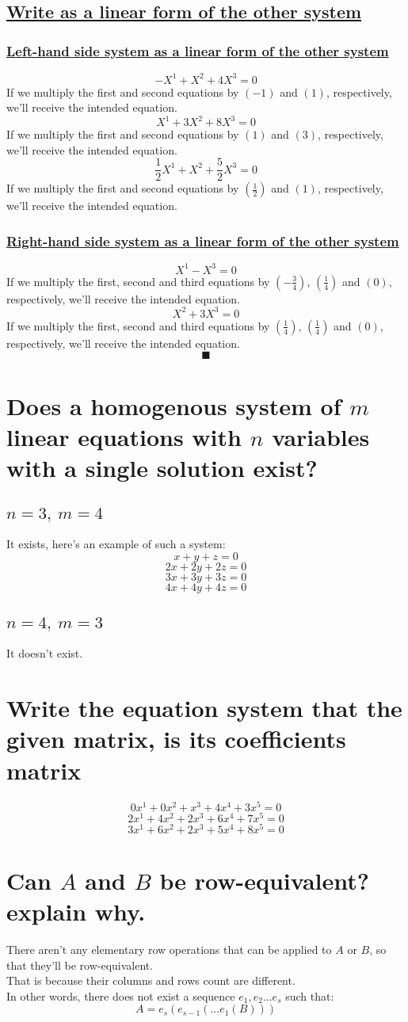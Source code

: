 \documentclass[a4paper, 12pt]{article}
\newcommand{\sub}[1]{\subsection{\underline{#1}}}
\newcommand{\subsub}[1]{\subsubsection{\underline{#1}}}
\newcommand{\?}{\stackrel{?}{=}}
\renewcommand{\qed}{$$\blacksquare$$}
\begin{document}
\sub{Write as a linear form of the other system}
\subsub{Left-hand side system as a linear form of the other system}
$$ -X^1 + X^2 + 4X^3 = 0 $$
If we multiply the first and second equations by $(-1)$ and $(1)$, respectively, we'll receive the intended equation.
$$ X^1 + 3X^2 + 8X^3 = 0 $$
If we multiply the first and second equations by $(1)$ and $(3)$, respectively, we'll receive the intended equation.
$$ \frac{1}{2}X^1 + X^2 + \frac{5}{2}X^3 = 0 $$
If we multiply the first and second equations by $(\frac{1}{2})$ and $(1)$, respectively, we'll receive the intended equation.

\subsub{Right-hand side system as a linear form of the other system}
$$ X^1 - X^3 = 0 $$
If we multiply the first, second and third equations by $(-\frac{3}{4})$, $(\frac{1}{4})$ and $(0)$, respectively, we'll receive the intended equation.
$$ X^2 + 3X^3 = 0 $$
If we multiply the first, second and third equations by $(\frac{1}{4})$, $(\frac{1}{4})$ and $(0)$, respectively, we'll receive the intended equation.
\qed\pagebreak

\setcounter{section}{12}
\section{Does a homogenous system of $m$ linear equations with $n$ variables with a single solution exist?}
\sub{$n=3,~m=4$}
It exists, here's an example of such a system:
$$ x+y+z=0 $$
$$ 2x+2y+2z=0 $$
$$ 3x+3y+3z=0 $$
$$ 4x+4y+4z=0 $$
\sub{$n=4,~m=3$}
It doesn't exist.

\setcounter{section}{15}
\section{Write the equation system that the given matrix, is its coefficients matrix}
$$ 0x^1+0x^2+x^3+4x^4+3x^5=0 $$
$$ 2x^1+4x^2+2x^3+6x^4+7x^5=0 $$
$$ 3x^1+6x^2+2x^3+5x^4+8x^5=0 $$

\setcounter{section}{17}
\section{Can $A$ and $B$ be row-equivalent? explain why.}
There aren't any elementary row operations that can be applied to $A$ or $B$, so that they'll be row-equivalent.\\
That is because their columns and rows count are different.\\
In other words, there does not exist a sequence $e_1,e_2...e_s$ such that:
$$ A = e_s(e_{s-1}(...e_1(B))) $$
\pagebreak
\end{document}
